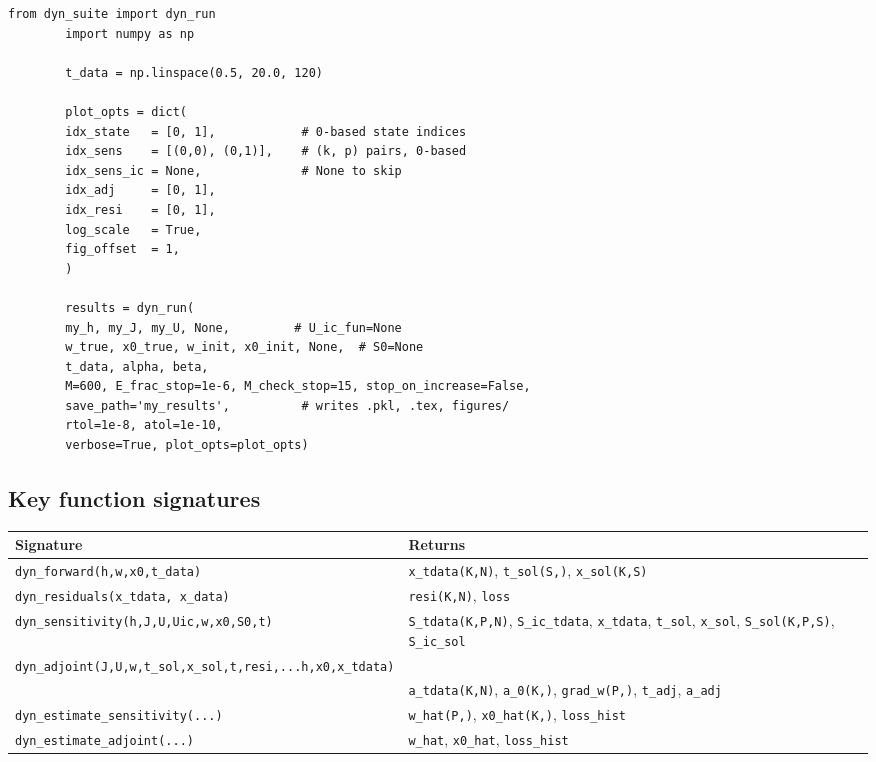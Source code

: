 \documentclass[10pt]{article}
\begin{document}
	\vspace{6pt} 
	
	\begin{lstlisting}[style=python]
		from dyn_suite import dyn_run
		import numpy as np
		
		t_data = np.linspace(0.5, 20.0, 120)
		
		plot_opts = dict(
		idx_state   = [0, 1],            # 0-based state indices
		idx_sens    = [(0,0), (0,1)],    # (k, p) pairs, 0-based
		idx_sens_ic = None,              # None to skip
		idx_adj     = [0, 1],
		idx_resi    = [0, 1],
		log_scale   = True,
		fig_offset  = 1,
		)
		
		results = dyn_run(
		my_h, my_J, my_U, None,         # U_ic_fun=None
		w_true, x0_true, w_init, x0_init, None,  # S0=None
		t_data, alpha, beta,
		M=600, E_frac_stop=1e-6, M_check_stop=15, stop_on_increase=False,
		save_path='my_results',          # writes .pkl, .tex, figures/
		rtol=1e-8, atol=1e-10,
		verbose=True, plot_opts=plot_opts)
	\end{lstlisting}
	
	\subsection{Key function signatures}
	
	\begin{tabular}{@{}L{7.5cm}L{7.8cm}@{}}
		\toprule
		Signature & Returns \\
		\midrule
		\texttt{dyn\_forward(h,w,x0,t\_data)} &
		\texttt{x\_tdata(K,N)}, \texttt{t\_sol(S,)}, \texttt{x\_sol(K,S)} \\
		\texttt{dyn\_residuals(x\_tdata, x\_data)} &
		\texttt{resi(K,N)}, \texttt{loss} \\
		\texttt{dyn\_sensitivity(h,J,U,Uic,w,x0,S0,t)} &
		\texttt{S\_tdata(K,P,N)}, \texttt{S\_ic\_tdata}, \texttt{x\_tdata},
		\texttt{t\_sol}, \texttt{x\_sol}, \texttt{S\_sol(K,P,S)}, \texttt{S\_ic\_sol} \\
		\texttt{dyn\_adjoint(J,U,w,t\_sol,x\_sol,t,resi,...h,x0,x\_tdata)} & \\
		& 
		\texttt{a\_tdata(K,N)}, \texttt{a\_0(K,)}, \texttt{grad\_w(P,)},
		\texttt{t\_adj}, \texttt{a\_adj} \\
		\texttt{dyn\_estimate\_sensitivity(...)} &
		\texttt{w\_hat(P,)}, \texttt{x0\_hat(K,)}, \texttt{loss\_hist} \\
		\texttt{dyn\_estimate\_adjoint(...)} &
		\texttt{w\_hat}, \texttt{x0\_hat}, \texttt{loss\_hist} \\
		\bottomrule
	\end{tabular}
	
\end{document}
